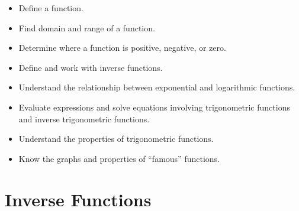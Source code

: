 \documentclass[handout]{ximera}
\begin{document}
\begin{itemize}
  \item
    Define a function.

  \item 
    Find domain and range of a function.

  \item
    Determine where a function is positive, negative, or zero.

  \item
    Define and work with inverse functions.

  \item
    Understand the relationship between exponential and logarithmic functions.
    
  \item
    Evaluate expressions and solve equations involving trigonometric functions and inverse trigonometric functions.
    
  \item
    Understand the properties of trigonometric functions.

  \item
    Know the graphs and properties of ``famous'' functions.
\end{itemize}

\section{Inverse Functions}
\label{section:inverse-functions}
\end{document}
